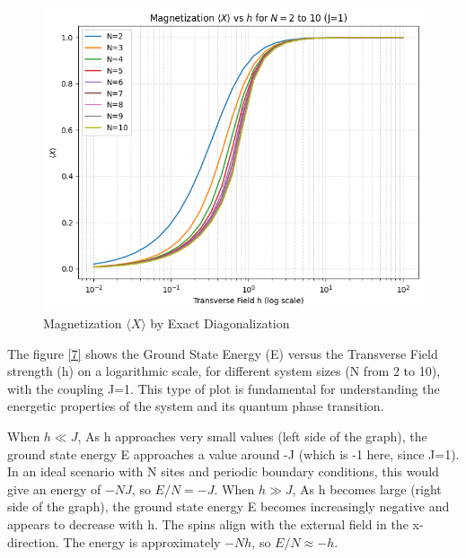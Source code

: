 \documentclass[pre,twocolumn,floatfix]{revtex4-1}
\begin{document}
\begin{figure}[H]
    \centering
    \includegraphics[width=0.5\linewidth]{images/classical_solution.png}
    \caption{Magnetization $\langle X \rangle$ by Exact Diagonalization}
    \label{6}
\end{figure}

The figure \ref{7} shows the Ground State Energy (E) versus the Transverse Field strength (h) on a logarithmic scale, for different system sizes (N from 2 to 10), with the coupling J=1. This type of plot is fundamental for understanding the energetic properties of the system and its quantum phase transition.

When $h\ll J$, As h approaches very small values (left side of the graph), the ground state energy E approaches a value around -J (which is -1 here, since J=1). In an ideal scenario with N sites and periodic boundary conditions, this would give an energy of $-NJ$, so $E/N=-J$. When $h \gg J$, As h becomes large (right side of the graph), the ground state energy E becomes increasingly negative and appears to decrease with h. The spins align with the external field in the x-direction. The energy is approximately $-Nh$, so $E/N \approx-h$.
\end{document}
